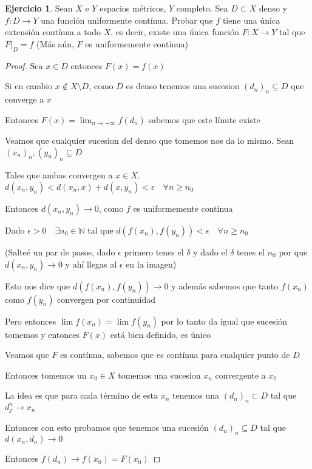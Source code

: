 \documentclass[11pt]{report}
\newcommand{\N}{\mathbb{N}}
\newcommand{\ra}{\rightarrow}
\theoremstyle{definition}
\newtheorem{ej}{Ejercicio}
\begin{document}
	\begin{ej}
		Sean $X$ e $Y$ espacios métricos, $Y$ completo. Sea $D \subset X$ denso y $f:D \ra Y$ una función uniformente contínua. Probar que $f$ tiene una única extensión contínua a todo $X$, es decir, existe una única función $F: X \ra Y$ tal que $F|_D =f $ (Más aún, $F$ es uniformemente contínua)
		\begin{proof}
			Sea $x \in D$ entonces $F(x) = f(x)$

			Si en cambio $x \notin X \setminus D$, como $D$ es denso tenemos una sucesion $(d_n)_n \subseteq D$ que converge a $x$ 

			Entonces $F(x) = \lim_{n\ra +\infty} f(d_n)$ sabemos que este límite existe 

			Veamos que cualquier sucesion del denso que tomemos nos da lo mismo. Sean  $(x_n)_n,(y_n)_n \subseteq D$

			Tales que ambas convergen a $x \in X$. $d(x_n,y_n) < d(x_n,x) + d(x,y_n) < \epsilon \quad \forall n\geq n_0$

			Entonces $d(x_n,y_n) \ra 0$, como $f$ es uniformemente contínua 

			Dado $\epsilon>0 \quad \exists n_0 \in \N$ tal que $d(f(x_n),f(y_n)) < \epsilon \quad \forall n\geq n_0$ 

			(Salteé un par de pasos, dado $\epsilon$ primero tenes el $\delta$ y dado el $\delta$ tenes el $n_0$ por que $d(x_n,y_n) \ra 0$ y ahí llegas al $\epsilon$ en la imagen)

			Esto nos dice que $d(f(x_n),f(y_n)) \ra 0$ y además sabemos que tanto $f(x_n)$ como $f(y_n)$ convergen por continuidad

			Pero entonces $\lim f(x_n) = \lim f(y_n)$ por lo tanto da igual que sucesión tomemos y entonces $F(x)$ está bien definido, es único

			Veamos que $F$ es contínua, sabemos que es contínua para cualquier punto de $D$

			Entonces tomemos un $x_0 \in X$ tomemos una sucesion $x_n$ convergente a $x_0$

			La idea es que para cada término de esta $x_n$ tenemos una $(d_n)_n \subset D$ tal que $d_j^n \ra x_n$

			Entonces con esto probamos que tenemos una sucesión $(d_n)_n \subseteq D$ tal que $d(x_n,d_n) \ra 0$

			Entonces $f(d_n) \ra f(x_0)= F(x_0)$

			


		\end{proof}
		
		
	\end{ej}
	
	
\end{document}
